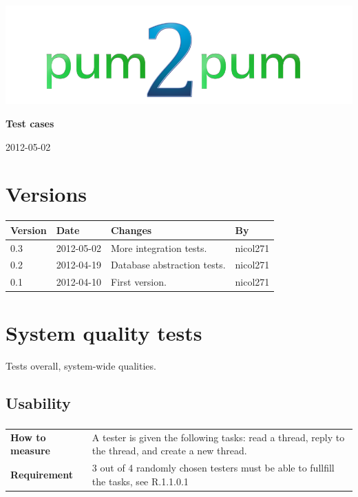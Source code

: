 \documentclass[a4paper, 12pt, titlepage]{article}
\newcommand{\urequirement}[2]{
	\subsubsection{}
	\begin{tabular}{l p{10cm}}
	\bf{How to measure} & 
		#1\\
	\bf{Requirement} & 
		#2\\
	\end{tabular}
}
\begin{document}
	
	\begin{titlepage}
		
		\includegraphics[scale=0.4]{logoNormal.png}
		
		\vspace{6cm}
		
		\begin{center}
			\Huge{\textbf{Test cases}} %
			
			\vspace{0.5cm}
			
			\huge{2012-05-02} %
		\end{center}
		
	\end{titlepage}
	
	\tableofcontents
	\newpage
	
	\section*{Versions}
	\begin{tabularx}{1\textwidth}{|l|l|X|l|}
		\hline
		\bf{Version} & \bf{Date} & \bf{Changes} & \bf{By} \\
		\hline
		0.3 & 2012-05-02 & More integration tests. & nicol271 \\
		\hline
		0.2 & 2012-04-19 & Database abstraction tests. & nicol271 \\
		\hline
		0.1 & 2012-04-10 & First version. & nicol271 \\
		\hline
	\end{tabularx}
	\newpage
	
	\section{System quality tests}
	Tests overall, system-wide qualities.

	\subsection{Usability}
		\urequirement
		{
			A tester is given the following tasks: read a thread, reply to the thread, and create a new thread.
		}{
			3 out of 4 randomly chosen testers must be able to fullfill the tasks, see R.1.1.0.1
		}
\end{document}
